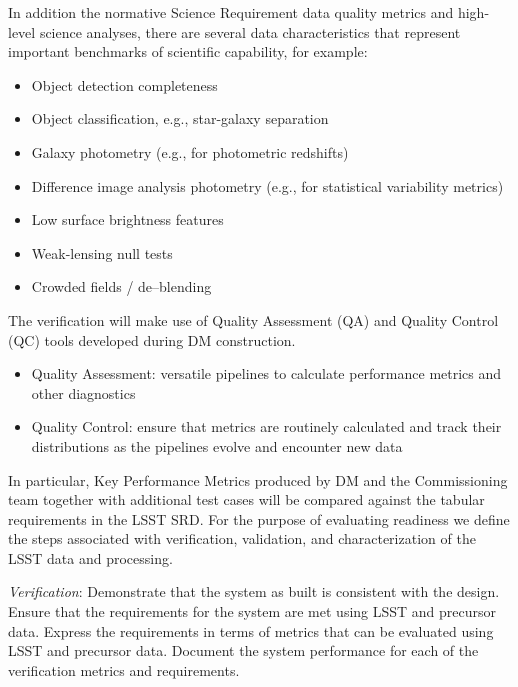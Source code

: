 In addition the normative Science Requirement data quality metrics and high-level science analyses, there are several data characteristics that represent important benchmarks of scientific capability, for example:

\begin{itemize}

	\item  Object detection completeness
	\item  Object classification, e.g., star-galaxy separation
	\item  Galaxy photometry (e.g., for photometric redshifts)
	\item  Difference image analysis photometry (e.g., for statistical variability metrics)
	\item  Low surface brightness features
	\item  Weak-lensing null tests
	\item  Crowded fields / de--blending
	
\end{itemize}

The verification will make use of Quality Assessment (QA) and Quality Control (QC) tools developed during DM construction.

\begin{itemize}

	\item Quality Assessment: versatile pipelines to calculate performance metrics and other diagnostics
	\item Quality Control: ensure that metrics are routinely calculated and track their distributions as the pipelines evolve and encounter new data
	
\end{itemize}

In particular, Key Performance Metrics produced by DM and the Commissioning team together with additional test cases will be compared against the tabular requirements in the LSST SRD.   For the purpose of evaluating readiness we define the steps associated with verification, validation, and characterization of the LSST data and processing.

{\it Verification}: Demonstrate that the system as built is consistent with the design. Ensure that the requirements for the system are met using LSST and precursor data. Express the requirements in terms of metrics that can be evaluated using LSST and precursor data. Document the system performance for each of the verification metrics and requirements.

